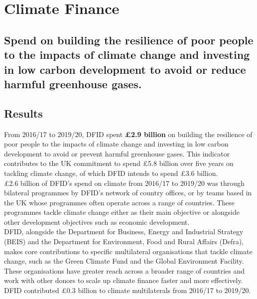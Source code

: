 \chapter{Climate Finance}

\section*{Spend on building the resilience of poor people to the impacts of climate change and investing in low carbon development to avoid or reduce harmful greenhouse gases.}


\thispagestyle{empty}



\section{Results}
From 2016/17 to 2019/20, DFID spent \textbf{\pounds 2.9 billion} on building the resilience of poor people to the impacts of climate change and investing in low carbon development to avoid or prevent harmful greenhouse gases. %
This indicator contributes to the UK commitment to spend  \pounds  5.8 billion over five years on tackling climate change, of which DFID intends to spend \pounds3.6 billion. \\ %

\pounds 2.6 billion of DFID's spend on climate from 2016/17 to 2019/20 was through bilateral programmes by DFID's network of country offices, or by teams based in the UK whose programmes often operate across a range of countries. %
These programmes tackle climate change either as their main objective or alongside other development objectives such as economic development. \\ %

DFID, alongside the Department for Business, Energy and Industrial Strategy (BEIS) and the Department for Environment, Food and Rural Affairs (Defra), makes core contributions to specific multilateral organisations that tackle climate change, such as the Green Climate Fund and the Global Environment Facility. %
These organisations have greater reach across a broader range of countries and work with other donors to scale up climate finance faster and more effectively. %
DFID contributed \pounds 0.3 billion to climate multilaterals from 2016/17 to 2019/20. %

